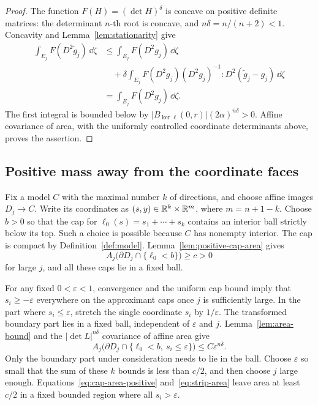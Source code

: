 \begin{proof}
The function \(F(H)=(\det H)^\delta\) is concave on positive definite
matrices: the determinant \(n\)-th root is concave, and
\(n\delta=n/(n+2)<1\).
Concavity and Lemma~\ref{lem:stationarity} give
\begin{align*}
 \int_{E_j}F(D^2\widetilde g_j)\,\dd\zeta
 &\le \int_{E_j}F(D^2g_j)\,\dd\zeta\\
 &\quad+\delta\int_{E_j}
 F(D^2g_j)(D^2g_j)^{-1}:D^2(\widetilde g_j-g_j)\,\dd\zeta\\
 &=\int_{E_j}F(D^2g_j)\,\dd\zeta.
\end{align*}
The first integral is bounded below by
\(\lvert B_{\ker\ell}(0,r)\rvert(2\alpha)^{n\delta}>0\).
Affine covariance of area, with the uniformly controlled coordinate
determinants above, proves the assertion.
\end{proof}

\subsection{Positive mass away from the coordinate faces}

Fix a model \(C\) with the maximal number \(k\) of directions, and choose
affine images \(D_j\to C\).  Write its coordinates as
\((s,y)\in\mathbb R^k\times\mathbb R^m\), where \(m=n+1-k\).
Choose \(b>0\) so that the cap for
\(\ell_0(s)=s_1+\cdots+s_k\) contains an interior ball strictly below its
top.  Such a choice is possible because \(C\) has nonempty interior.
The cap is compact by Definition~\ref{def:model}.
Lemma~\ref{lem:positive-cap-area} gives
\begin{equation}\label{eq:cap-area-positive}
 A_j\bigl(\partial D_j\cap\{\ell_0<b\}\bigr)\ge c>0
\end{equation}
for large \(j\), and all these caps lie in a fixed ball.

For any fixed \(0<\varepsilon<1\), convergence and the uniform cap bound
imply that \(s_i\ge-\varepsilon\) everywhere on the approximant caps
once \(j\) is sufficiently large.  In the part where \(s_i\le\varepsilon\),
stretch the single coordinate \(s_i\) by \(1/\varepsilon\).
The transformed boundary part lies in a fixed ball, independent of
\(\varepsilon\) and \(j\).  Lemma~\ref{lem:area-bound} and the
\(|\det L|^{n\delta}\) covariance of affine area give
\begin{equation}\label{eq:strip-area}
 A_j\bigl(\partial D_j\cap\{\ell_0<b,\ s_i\le\varepsilon\}\bigr)
       \le C\varepsilon^{n\delta}.
\end{equation}
Only the boundary part under consideration needs to lie in the ball.
Choose \(\varepsilon\) so small that the sum of these \(k\) bounds is
less than \(c/2\), and then choose \(j\) large enough.
Equations~\eqref{eq:cap-area-positive} and~\eqref{eq:strip-area} leave
area at least \(c/2\) in a fixed bounded region where all \(s_i>\varepsilon\).

